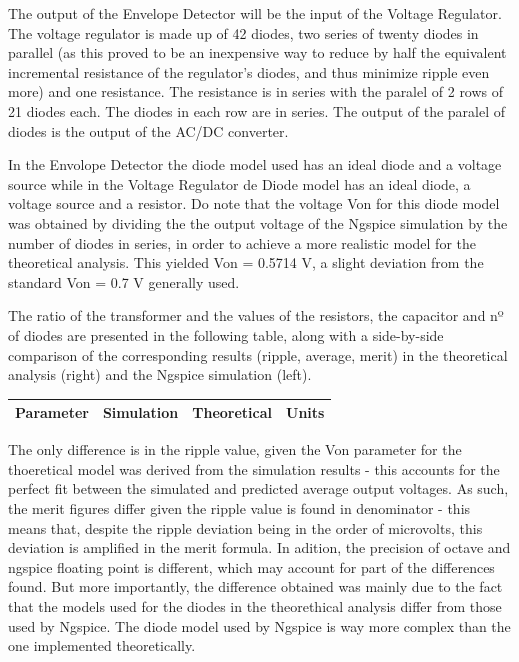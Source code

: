 The output of the Envelope Detector will be the input of the Voltage Regulator. The voltage regulator is made up of 42 diodes, two series of twenty diodes in parallel (as this proved to be an inexpensive way to reduce by half the equivalent incremental resistance of the regulator's diodes, and thus minimize ripple even more) and one resistance. The resistance is in series with the paralel of 2 rows of 21 diodes each. The diodes in each row are in series. The output of the paralel of diodes is the output of the AC/DC converter.

In the Envolope Detector the diode model used has an ideal diode and a voltage source while in the Voltage Regulator de Diode model has an ideal diode, a voltage source and a resistor. Do note that the voltage Von for this diode model was obtained by dividing the the output voltage of the Ngspice simulation by the number of diodes in series, in order to achieve a more realistic model for the theoretical analysis. This yielded Von = 0.5714 V, a slight deviation from the standard Von = 0.7 V generally used.

The ratio of the transformer and the values of the resistors, the capacitor and nº of diodes are presented in the following table, along with a side-by-side comparison of the corresponding results (ripple, average, merit) in the theoretical analysis (right) and the Ngspice simulation (left).

\hfill
 \parbox{1\linewidth}{
  \centering
  \begin{tabular}{|l|l|l|r|}
    \hline    
    {\bf Parameter} & {\bf Simulation} & {\bf Theoretical } & {\bf Units }\\ \hline
    
  \end{tabular}
  \label{tab:results}
    

  }


    The only difference is in the ripple value, given the Von parameter for the thoeretical model was derived from the simulation results - this accounts for the perfect fit between the simulated and predicted average output voltages. As such, the merit figures differ given the ripple value is found in denominator - this means that, despite the ripple deviation being in the order of microvolts, this deviation is amplified in the merit formula. In adition, the precision of octave and ngspice floating point is different, which may account for part of the differences found. But more importantly, the difference obtained was mainly due to the fact that the models
used for the diodes in the theorethical analysis differ from those used by Ngspice. The diode
model used by Ngspice is way more complex than the one implemented theoretically.
  
